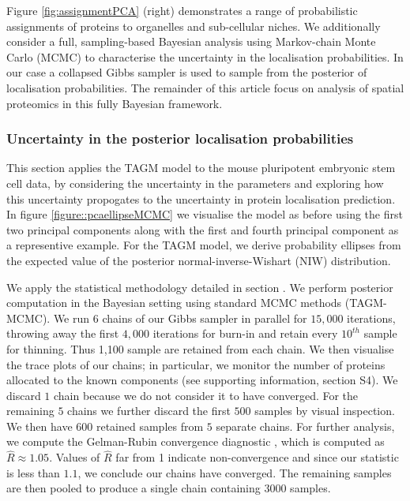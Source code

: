 \documentclass[10pt,letterpaper]{article}\usepackage[]{graphicx}\usepackage[]{color}
\begin{document}
Figure \ref{fig:assignmentPCA} (right) demonstrates a range of
probabilistic assignments of proteins to organelles and sub-cellular
niches. We additionally consider a full, sampling-based Bayesian
analysis using Markov-chain Monte Carlo (MCMC) to characterise the
uncertainty in the localisation probabilities.  In our case a
collapsed Gibbs sampler is used to sample from the posterior of
localisation probabilities. The remainder of this article focus on
analysis of spatial proteomics in this fully Bayesian framework.




\subsubsection*{Uncertainty in the posterior localisation probabilities}

This section applies the TAGM model to the mouse pluripotent embryonic
stem cell data, by considering the uncertainty in the parameters and
exploring how this uncertainty propogates to the uncertainty in
protein localisation prediction.  In figure
\ref{figure::pcaellipseMCMC} we visualise the model as before using
the first two principal components along with the first and fourth
principal component as a representive example.  For the TAGM model, we
derive probability ellipses from the expected value of the posterior
normal-inverse-Wishart (NIW) distribution.

We apply the statistical methodology detailed in section
.  We perform posterior computation in the
Bayesian setting using standard MCMC methods (TAGM-MCMC).  We run $6$
chains of our Gibbs sampler in parallel for $15,000$ iterations,
throwing away the first $4,000$ iterations for burn-in and retain
every $10^{th}$ sample for thinning.  Thus 1,100 sample are retained
from each chain. We then visualise the trace plots of our chains; in
particular, we monitor the number of proteins allocated to the known
components (see supporting information, section S4). We discard $1$ chain because
we do not consider it to have converged.  For the remaining $5$
chains we further discard the first $500$ samples by visual
inspection.  We then have $600$ retained samples from $5$ separate
chains. For further analysis, we compute the Gelman-Rubin convergence
diagnostic \cite{Gelman:1992, Brooks:1998}, which is computed as
$\hat{R} \approx 1.05$.  Values of $\hat{R}$ far from 1 indicate
non-convergence and since our statistic is less than $1.1$, we
conclude our chains have converged. The remaining samples are then
pooled to produce a single chain containing $3000$ samples.
\end{document}
